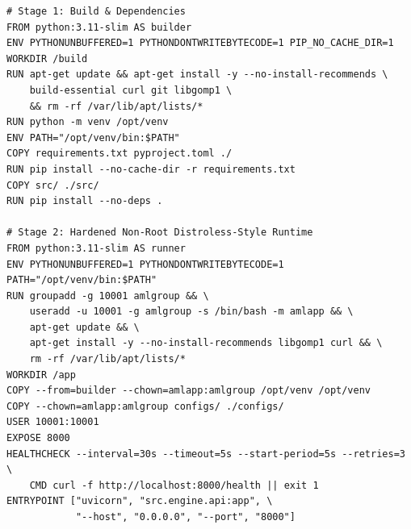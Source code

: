 \begin{lstlisting}[caption={Multi-Stage Production Dockerfile for C-STGB Platform.}, label={app_lst:dockerfile}]
# Stage 1: Build & Dependencies
FROM python:3.11-slim AS builder
ENV PYTHONUNBUFFERED=1 PYTHONDONTWRITEBYTECODE=1 PIP_NO_CACHE_DIR=1
WORKDIR /build
RUN apt-get update && apt-get install -y --no-install-recommends \
    build-essential curl git libgomp1 \
    && rm -rf /var/lib/apt/lists/*
RUN python -m venv /opt/venv
ENV PATH="/opt/venv/bin:$PATH"
COPY requirements.txt pyproject.toml ./
RUN pip install --no-cache-dir -r requirements.txt
COPY src/ ./src/
RUN pip install --no-deps .

# Stage 2: Hardened Non-Root Distroless-Style Runtime
FROM python:3.11-slim AS runner
ENV PYTHONUNBUFFERED=1 PYTHONDONTWRITEBYTECODE=1 PATH="/opt/venv/bin:$PATH"
RUN groupadd -g 10001 amlgroup && \
    useradd -u 10001 -g amlgroup -s /bin/bash -m amlapp && \
    apt-get update && \
    apt-get install -y --no-install-recommends libgomp1 curl && \
    rm -rf /var/lib/apt/lists/*
WORKDIR /app
COPY --from=builder --chown=amlapp:amlgroup /opt/venv /opt/venv
COPY --chown=amlapp:amlgroup configs/ ./configs/
USER 10001:10001
EXPOSE 8000
HEALTHCHECK --interval=30s --timeout=5s --start-period=5s --retries=3 \
    CMD curl -f http://localhost:8000/health || exit 1
ENTRYPOINT ["uvicorn", "src.engine.api:app", \
            "--host", "0.0.0.0", "--port", "8000"]
\end{lstlisting}

